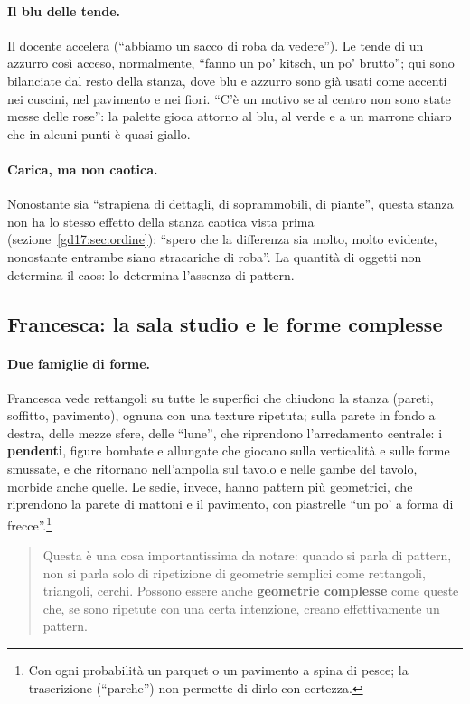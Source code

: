\paragraph{Il blu delle tende.} Il docente accelera (``abbiamo un sacco di roba da
vedere''). Le tende di un azzurro così acceso, normalmente, ``fanno un po' kitsch, un po'
brutto''; qui sono bilanciate dal resto della stanza, dove blu e azzurro sono già usati
come accenti nei cuscini, nel pavimento e nei fiori. ``C'è un motivo se al centro non sono
state messe delle rose'': la palette gioca attorno al blu, al verde e a un marrone chiaro
che in alcuni punti è quasi giallo.

\paragraph{Carica, ma non caotica.} Nonostante sia ``strapiena di dettagli, di
soprammobili, di piante'', questa stanza non ha lo stesso effetto della stanza caotica
vista prima (sezione~\ref{gd17:sec:ordine}): ``spero che la differenza sia molto, molto
evidente, nonostante entrambe siano stracariche di roba''. La quantità di oggetti non
determina il caos: lo determina l'assenza di pattern.

\subsection{Francesca: la sala studio e le forme complesse}

\paragraph{Due famiglie di forme.} Francesca vede rettangoli su tutte le superfici che
chiudono la stanza (pareti, soffitto, pavimento), ognuna con una texture ripetuta; sulla
parete in fondo a destra, delle mezze sfere, delle ``lune'', che riprendono
l'arredamento centrale: i \textbf{pendenti}, figure bombate e allungate che giocano sulla
verticalità e sulle forme smussate, e che ritornano nell'ampolla sul tavolo e nelle gambe
del tavolo, morbide anche quelle. Le sedie, invece, hanno pattern più geometrici, che
riprendono la parete di mattoni e il pavimento, con piastrelle ``un po' a forma di
frecce''.\footnote{Con ogni probabilità un parquet o un pavimento a spina di pesce; la
trascrizione (``parche'') non permette di dirlo con certezza.}
\begin{quote}
Questa è una cosa importantissima da notare: quando si parla di pattern, non si parla
solo di ripetizione di geometrie semplici come rettangoli, triangoli, cerchi. Possono
essere anche \textbf{geometrie complesse} come queste che, se sono ripetute con una
certa intenzione, creano effettivamente un pattern.
\end{quote}

